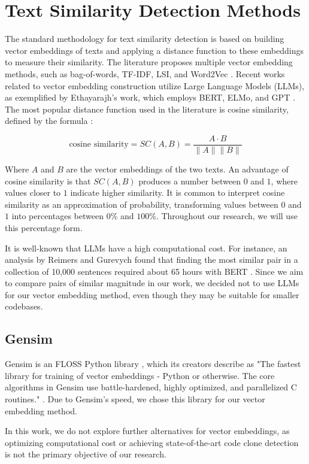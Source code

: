 \en

\section{Text Similarity Detection Methods}
\label{sec:similarity}

The standard methodology for text similarity detection is based on building
vector embeddings of texts and applying a distance function to these embeddings
to measure their similarity. The literature proposes multiple vector
embedding methods, such as bag-of-words, TF-IDF, LSI, and Word2Vec
\citep{gensimlivro}. Recent works related to vector embedding construction
utilize Large Language Models (LLMs), as exemplified by Ethayarajh's work,
which employs BERT, ELMo, and GPT \citep{llmsimilar}. The most popular distance
function used in the literature is cosine similarity, defined by the formula
\citep{cosineref}:

$$\text{cosine similarity} = SC(A,B) = \frac{ A \cdot B}{ \lVert A \rVert \lVert B \rVert }$$

Where $A$ and $B$ are the vector embeddings of the two texts. An advantage of
cosine similarity is that $SC(A,B)$ produces a number between $0$ and $1$,
where values closer to $1$ indicate higher similarity. It is common to
interpret cosine similarity as an approximation of probability, transforming
values between $0$ and $1$ into percentages between $0\%$ and $100\%$.
Throughout our research, we will use this percentage form.

It is well-known that LLMs have a high computational cost. For instance, an
analysis by Reimers and Gurevych found that finding the most similar pair in a
collection of 10,000 sentences required about 65 hours with BERT
\citep{bertsimilar}. Since we aim to compare pairs of similar magnitude in
our work, we decided not to use LLMs for our vector embedding method, even
though they may be suitable for smaller codebases.

\subsection{Gensim}

Gensim is an FLOSS Python library \citep{gensim}, which its creators
describe as "The fastest library for training of vector embeddings - Python or
otherwise. The core algorithms in Gensim use battle-hardened, highly optimized,
and parallelized C routines." \citep{gensimsite}. Due to Gensim's speed, we
chose this library for our vector embedding method.

In this work, we do not explore further alternatives for vector embeddings, as
optimizing computational cost or achieving state-of-the-art code clone
detection is not the primary objective of our research.
